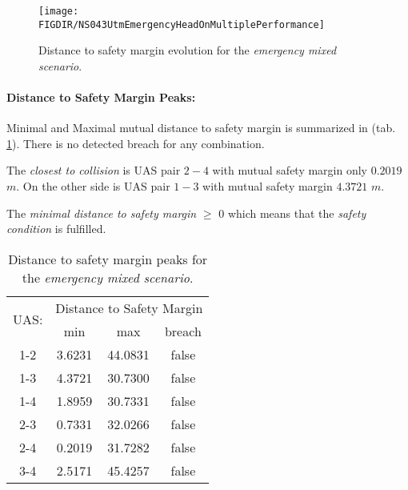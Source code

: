    \begin{figure}[H]
        \centering
        \texttt{[image: \\FIGDIR/NS043UtmEmergencyHeadOnMultiplePerformance]} 
        \caption{Distance to safety margin evolution for the  \emph{emergency mixed scenario}.}
        \label{fig:testCaseMultipleAvoidancePerformance}
    \end{figure}
    
    \paragraph{Distance to Safety Margin Peaks:} Minimal and Maximal mutual distance to safety margin is summarized in (tab. \ref{tab:testCaseEmergencyMixedSafetyMarginDistances}). There is no detected breach for any combination. 
    
    The \emph{closest to collision} is UAS pair $2-4$ with mutual safety margin only $0.2019$ $m$. On the other side is UAS pair $1-3$ with mutual safety margin $4.3721$ $m$. 
    
    The \emph{minimal distance to safety margin}  $\ge$ 0 which means that the \emph{safety condition} is fulfilled. 
    
    \begin{table}[H]
        \centering
        \begin{tabular}{c||c|c|c}
            \multirow{2}{*}{UAS:} & \multicolumn{3}{c}{Distance to Safety Margin} \\ \cline{2-4} 
                      & min          & max         & breach         \\ \hline\hline
                1-2   & 3.6231       & 44.0831     & false          \\ \hline
                1-3   & 4.3721       & 30.7300     & false          \\ \hline
                1-4   & 1.8959       & 30.7331     & false          \\ \hline
                2-3   & 0.7331       & 32.0266     & false          \\ \hline
                2-4   & 0.2019       & 31.7282     & false          \\ \hline
                3-4   & 2.5171       & 45.4257     & false          \\ 
        \end{tabular}
        \caption{Distance to safety margin peaks for the \emph{emergency mixed scenario}.}
        \label{tab:testCaseEmergencyMixedSafetyMarginDistances}
    \end{table}
    
